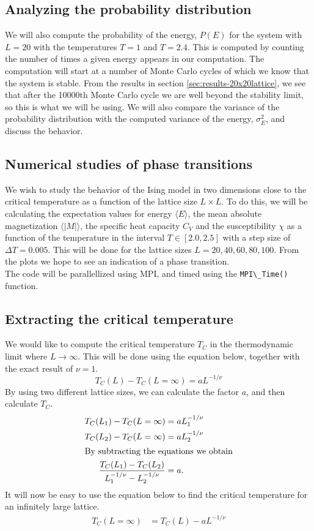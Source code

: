 \documentclass[../main.tex]{subfiles}
\begin{document}
\subsection{Analyzing the probability distribution}
We will also compute the probability of the energy, $P(E)$ for the system with $L = 20$ with the temperatures $T= 1$ and $T= 2.4$. This is computed by counting the number of times a given energy appears in our computation. The computation will start at a number of Monte Carlo cycles of which we know that the system is stable. From the results in section \ref{sec:results-20x20lattice}, we see that after the 10000th Monte Carlo cycle we are well beyond the stability limit, so this is what we will be using. We will also compare the variance of the probability distribution with the computed variance of the energy, $\sigma_E^2$, and discuss the behavior.

\subsection{Numerical studies of phase transitions}
We wish to study the behavior of the Ising model in two dimensions close to the critical temperature as a function of the lattice size $L \times L$.  To do this, we will be calculating the expectation values for energy $\langle E \rangle$, the mean absolute magnetization $\langle |M| \rangle$, the specific heat capacity $C_V$ and the susceptibility $\chi$ as a function of the temperature in the interval $ T \in [2.0,2.5]$ with a step size of $\Delta T = 0.005$. This will be done for the lattice sizes $L = {20, 40, 60, 80, 100}$. From the plots we hope to see an indication of a phase transition.\\
The code will be parallellized using MPI, and timed using the \verb+MPI\_Time()+ function.

\subsection{Extracting the critical temperature} \label{sec:theory-extractingTC}
We would like to compute the critical temperature $T_C$ in the thermodynamic limit where $L \rightarrow \infty$. This will be done using the equation below, together with the exact result of $\nu = 1$.
\[T_C(L) - T_C(L = \infty) = aL^{-1/\nu}\]
By using two different lattice sizes, we can calculate the factor $a$, and then calculate  $T_C$.
\begin{align}
  T_C(L_1) - T_C(L = \infty) &= aL_1^{-1/\nu} \nonumber\\
  T_C(L_2) - T_C(L = \infty) &= aL_2^{-1/\nu} \nonumber\\
  \intertext{By subtracting the equations we obtain}
  \frac{T_C(L_1) - T_C(L_2)}{L_1^{-1/\nu} - L_2^{-1/\nu}} &= a. \label{eq:a}
\end{align}
It will now be easy to use the equation below to find the critical temperature for an infinitely large lattice.
\begin{align}
T_C(L = \infty) &= T_C(L) - aL^{-1/\nu} \label{eq:TC}
\end{align}
\end{document}
